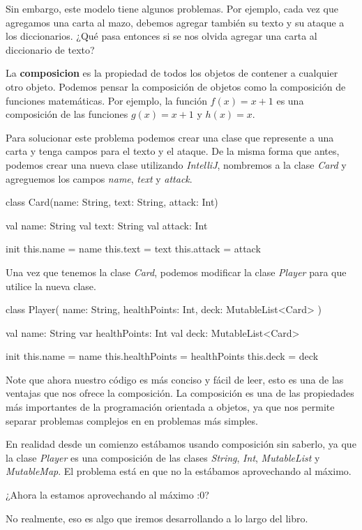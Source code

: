   Sin embargo, este modelo tiene algunos problemas.
  Por ejemplo, cada vez que agregamos una carta al mazo, debemos agregar también su texto y su
  ataque a los diccionarios.
  ¿Qué pasa entonces si se nos olvida agregar una carta al diccionario de texto?

  \begin{defaultbox}[Composición]
    La \textbf{composicion} es la propiedad de todos los objetos de contener a cualquier otro objeto.
    Podemos pensar la composición de objetos como la composición de funciones matemáticas.
    Por ejemplo, la función \(f(x) = x + 1\) es una composición de las funciones \(g(x) = x + 1\) y
    \(h(x) = x\).
  \end{defaultbox}

  Para solucionar este problema podemos crear una clase que represente a una carta y tenga campos
  para el texto y el ataque.
  De la misma forma que antes, podemos crear una nueva clase utilizando \textit{IntelliJ}, 
  nombremos a la clase \textit{Card} y agreguemos los campos \textit{name}, \textit{text} y
  \textit{attack}.

  \begin{kotlin}
    class Card(name: String, text: String, attack: Int) {
      val name: String
      val text: String
      val attack: Int

      init {
        this.name = name
        this.text = text
        this.attack = attack
      }
    }
  \end{kotlin}

  Una vez que tenemos la clase \textit{Card}, podemos modificar la clase \textit{Player} para que
  utilice la nueva clase.

  \begin{kotlin}
    class Player(
      name: String,
      healthPoints: Int,
      deck: MutableList<Card>
    ) {
      val name: String
      var healthPoints: Int
      val deck: MutableList<Card>

      init {
        this.name = name
        this.healthPoints = healthPoints
        this.deck = deck
      }
    }
  \end{kotlin}

  Note que ahora nuestro código es más conciso y fácil de leer, esto es una de las ventajas que
  nos ofrece la composición.
  La composición es una de las propiedades más importantes de la programación orientada a objetos,
  ya que nos permite separar problemas complejos en en problemas más simples.

  En realidad desde un comienzo estábamos usando composición sin saberlo, ya que la clase 
  \textit{Player} es una composición de las clases \textit{String}, \textit{Int}, 
  \textit{MutableList} y \textit{MutableMap}.
  El problema está en que no la estábamos aprovechando al máximo.

  \begin{center}
    ¿Ahora la estamos aprovechando al máximo :0?
  \end{center}

  No realmente, eso es algo que iremos desarrollando a lo largo del libro.
